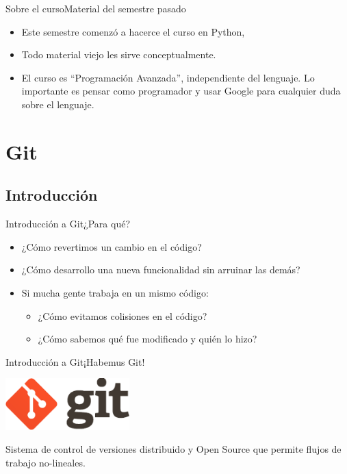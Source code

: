 \documentclass[spanish]{beamer}
\begin{document}
\begin{frame}{Sobre el curso}{Material del semestre pasado}
    \begin{itemize}
        \item Este semestre comenzó a hacerce el curso en Python,
        \item Todo material viejo les sirve conceptualmente.
        \item El curso es ``Programación Avanzada'', independiente del lenguaje. Lo importante es pensar como programador y usar Google para cualquier duda sobre el lenguaje.
    \end{itemize}
\end{frame}

\section{Git}
\subsection{Introducción}

\begin{frame}{Introducción a Git}{¿Para qué?}
    \begin{itemize}
        \item ¿Cómo revertimos un cambio en el código?
        \pause
        \item ¿Cómo desarrollo una nueva funcionalidad sin arruinar las demás?
        \pause
        \item Si mucha gente trabaja en un mismo código:
            \pause
          \begin{itemize}
            \item ¿Cómo evitamos colisiones en el código?
            \item ¿Cómo sabemos qué fue modificado y quién lo hizo?
        \end{itemize}
    \end{itemize}
\end{frame}

\begin{frame}{Introducción a Git}{¡Habemus Git!}
    \begin{center}
        \includegraphics[height=2cm]{Images/git-logo.png}
    \end{center}
    
    \pause
    \begin{definition}
        Sistema de control de versiones distribuido y Open Source que permite flujos de trabajo \alert{no-lineales}.
  \end{definition}
\end{frame}
    
\end{document}
